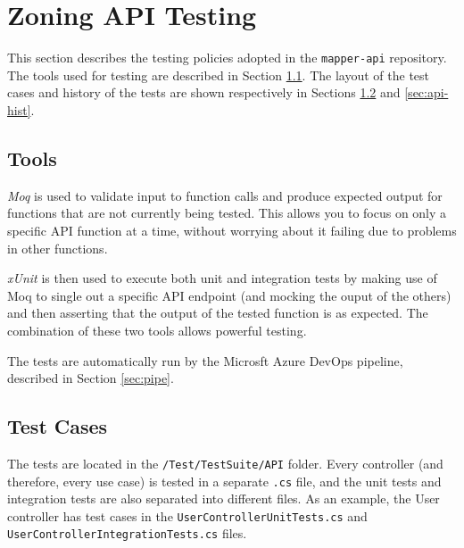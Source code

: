 \documentclass{article}
\begin{document}
    \newpage


    \section{Zoning API Testing}
    \label{sec:mapper-api}

    This section describes the testing policies adopted in the
    \texttt{mapper-api} repository. The tools used for testing are described in
    Section \ref{sec:api-tools}. The layout of the test cases and history of
    the tests are shown respectively in Sections \ref{sec:api-cases} and
    \ref{sec:api-hist}.

    \subsection{Tools}
    \label{sec:api-tools}

    \textit{Moq} is used to validate input to function calls and produce
    expected output for functions that are not currently being tested. This
    allows you to focus on only a specific API function at a time, without
    worrying about it failing due to problems in other functions.
    
    \textit{xUnit} is then used to execute both unit and integration tests by
    making use of Moq to single out a specific API endpoint (and mocking the
    ouput of the others) and then asserting that the output of the tested
    function is as expected. The combination of these two tools allows powerful
    testing.

    The tests are automatically run by the Microsft Azure DevOps pipeline,
    described in Section \ref{sec:pipe}.

    \subsection{Test Cases}
    \label{sec:api-cases}

    The tests are located in the \texttt{/Test/TestSuite/API} folder. Every
    controller (and therefore, every use case) is tested in a separate
    \texttt{.cs} file, and the unit tests and integration tests are also
    separated into different files. As an example, the User controller has test
    cases in the \texttt{UserControllerUnitTests.cs} and
    \texttt{UserControllerIntegrationTests.cs} files.
\end{document}
